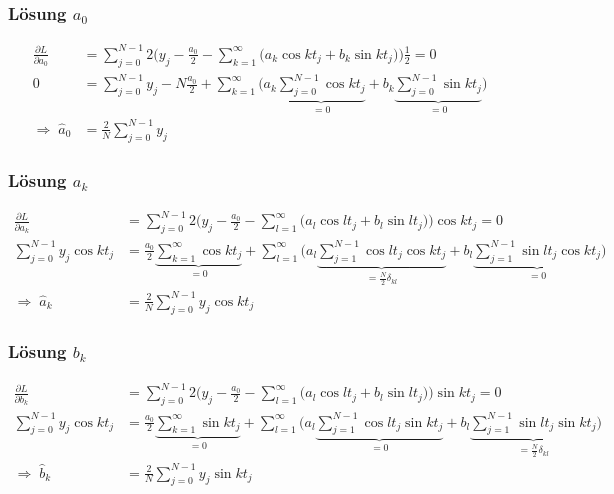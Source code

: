 %
%
\begin{frame}
\frametitle{Lösung $a_0$}
\begin{align*}
\frac{\partial L}{\partial a_0}
&=
\sum_{j=0}^{N-1} 2\biggl(y_j-\frac{a_0}2-\sum_{k=1}^\infty
\bigl(a_k\cos kt_j + b_k\sin kt_j\bigr)
\biggr)\frac12=0
\\
0
&=
\sum_{j=0}^{N-1} y_j - N\frac{a_0}{2} 
+\sum_{k=1}^\infty\biggl(
a_k\underbrace{\sum_{j=0}^{N-1}\cos kt_j}_{\displaystyle=0}
+
b_k\underbrace{\sum_{j=0}^{N-1}\sin kt_j}_{\displaystyle=0}
\biggr)
\\
\Rightarrow\;
\hat a_0&=\frac{2}{N}\sum_{j=0}^{N-1} y_j
\end{align*}
\end{frame}

%
%
\begin{frame}
\frametitle{Lösung $a_k$}
\begin{align*}
\frac{\partial L}{\partial a_k}
&=
\sum_{j=0}^{N-1} 2\biggl(y_j-\frac{a_0}2-\sum_{l=1}^\infty
\bigl(a_l\cos lt_j + b_l\sin lt_j\bigr)
\biggr)\cos kt_j=0
\\
\sum_{j=0}^{N-1}y_j\cos kt_j
&=
\frac{a_0}{2}\underbrace{\sum_{k=1}^\infty\cos kt_j}_{\displaystyle=0}
+
\sum_{l=1}^\infty
\biggl(
a_l
\underbrace{
\sum_{j=1}^{N-1}
\cos lt_j
\cos kt_j
}_{\displaystyle=\frac{N}{2}\delta_{kl}}
+
b_l
\underbrace{
\sum_{j=1}^{N-1}
\sin lt_j
\cos kt_j
}_{\displaystyle=0}
\biggr)
\\
\Rightarrow\;
\hat a_k&=\frac{2}{N}\sum_{j=0}^{N-1}y_j\cos kt_j
\end{align*}
\end{frame}

%
%
\begin{frame}
\frametitle{Lösung $b_k$}
\begin{align*}
\frac{\partial L}{\partial b_k}
&=
\sum_{j=0}^{N-1} 2\biggl(y_j-\frac{a_0}2-\sum_{l=1}^\infty
\bigl(a_l\cos lt_j + b_l\sin lt_j\bigr)
\biggr)\sin kt_j=0
\\
\sum_{j=0}^{N-1}y_j\cos kt_j
&=
\frac{a_0}{2}\underbrace{\sum_{k=1}^\infty\sin kt_j}_{\displaystyle=0}
+
\sum_{l=1}^\infty
\biggl(
a_l
\underbrace{
\sum_{j=1}^{N-1}
\cos lt_j
\sin kt_j
}_{\displaystyle=0}
+
b_l
\underbrace{
\sum_{j=1}^{N-1}
\sin lt_j
\sin kt_j
}_{\displaystyle=\frac{N}{2}\delta_{kl}}
\biggr)
\\
\Rightarrow\;
\hat b_k&=\frac{2}{N}\sum_{j=0}^{N-1}y_j\sin kt_j
\end{align*}
\end{frame}


